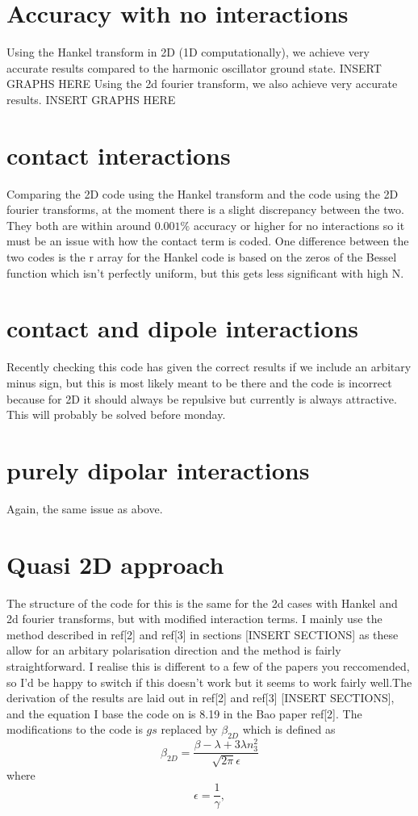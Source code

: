 \documentclass[12pt]{article}
\begin{document}
\section{Accuracy with no interactions}
Using the Hankel transform in 2D (1D computationally), we achieve very accurate results compared to the harmonic oscillator ground state.
INSERT GRAPHS HERE
Using the 2d fourier transform, we also achieve very accurate results.
INSERT GRAPHS HERE
\section{contact interactions}
Comparing the 2D code using the Hankel transform and the code using the 2D fourier transforms, at the moment there is a slight discrepancy between the two. They both are within around $0.001\%$ accuracy or higher for no interactions so it must be an issue with how the contact term is coded. One difference between the two codes is the r array for the Hankel code is based on the zeros of the Bessel function which isn't perfectly uniform, but this gets less significant with high N.
\section{contact and dipole interactions}
Recently checking this code has given the correct results if we include an arbitary minus sign, but this is most likely meant to be there and the code is incorrect because for 2D it should always be repulsive but currently is always attractive. This will probably be solved before monday.
\section{purely dipolar interactions}
Again, the same issue as above.
\section{Quasi 2D approach}
The structure of the code for this is the same for the 2d cases with Hankel and 2d fourier transforms, but with modified interaction terms. I mainly use the method described in ref[2] and ref[3] in sections [INSERT SECTIONS] as these allow for an arbitary polarisation direction and the method is fairly straightforward. I realise this is different to a few of the papers you reccomended, so I'd be happy to switch if this doesn't work but it seems to work fairly well.The derivation of the results are laid out in ref[2] and ref[3] [INSERT SECTIONS], and the equation I base the code on is 8.19 in the Bao paper ref[2]. 
The modifications to the code is $gs$ replaced by $\beta_{2D}$ which is defined as 
\begin{equation}
\beta_{2D}=\frac{\beta -\lambda +3\lambda n_{3}^{2}}{\sqrt{2\pi}\epsilon}
\end{equation}
where 
\begin{equation}
\epsilon = \frac{1}{\gamma},
\end{equation}
\end{document}
